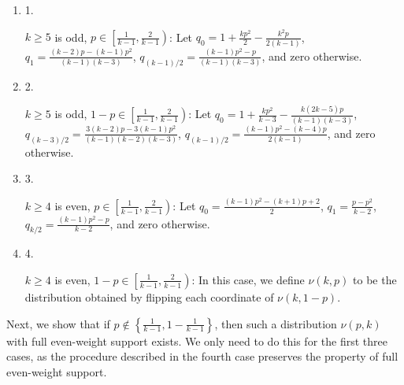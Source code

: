 \begin{enumerate}


\item[] 
1. 


$k\geqslant 5$ is odd, $p\in\left[\frac{1}{k-1},\frac{2}{k-1}\right)$: Let $q_{0}=1+\frac{kp^{2}}{2}-\frac{k^{2}p}{2(k-1)}$, $q_{1}=\frac{(k-2)p-(k-1)p^{2}}{(k-1)(k-3)}$, $q_{(k-1)/2}=\frac{(k-1)p^{2}-p}{(k-1)(k-3)}$, and zero otherwise.\par





\item[] 
2. 


$k\geqslant 5$ is odd, $1-p\in\left[\frac{1}{k-1},\frac{2}{k-1}\right)$: Let $q_{0}=1+\frac{kp^{2}}{k-3}-\frac{k(2k-5)p}{(k-1)(k-3)}$, $q_{(k-3)/2}=\frac{3(k-2)p-3(k-1)p^{2}}{(k-1)(k-2)(k-3)}$, $q_{(k-1)/2}=\frac{(k-1)p^{2}-(k-4)p}{2(k-1)}$, and zero otherwise.\par





\item[] 
3. 


$k\geqslant 4$ is even, $p\in\left[\frac{1}{k-1},\frac{2}{k-1}\right)$: Let $q_{0}=\frac{(k-1)p^{2}-(k+1)p+2}{2}$, $q_{1}=\frac{p-p^{2}}{k-2}$, $q_{k/2}=\frac{(k-1)p^{2}-p}{k-2}$, and zero otherwise.\par





\item[] 
4. 


$k\geqslant 4$ is even, $1-p\in\left[\frac{1}{k-1},\frac{2}{k-1}\right)$: In this case, we define $\nu(k,p)$ to be the distribution obtained by flipping each coordinate of $\nu(k,1-p)$.\par





\end{enumerate}




Next, we show that if $p\not\in\left\{\frac{1}{k-1},1-\frac{1}{k-1}\right\}$, then such a distribution $\nu(p,k)$ with full even-weight support exists.
We only need to do this for the first three cases, as the procedure described in the fourth case preserves the property of full even-weight support.\par




